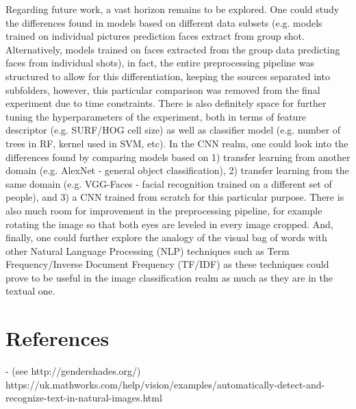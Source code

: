 \documentclass[11pt]{article}
\begin{document}
    Regarding future work, a vast horizon remains to be explored. One could study the differences found in models based on different data subsets (e.g. models trained on individual pictures prediction faces extract from group shot. Alternatively, models trained on faces extracted from the group data predicting faces from individual shots), in fact, the entire preprocessing pipeline was structured to allow for this differentiation, keeping the sources separated into subfolders, however, this particular comparison was removed from the final experiment due to time constraints. There is also definitely space for further tuning the hyperparameters of the experiment, both in terms of feature descriptor (e.g. SURF/HOG cell size) as well as classifier model (e.g. number of trees in RF, kernel used in SVM, etc). In the CNN realm, one could look into the differences found by comparing models based on 1) transfer learning from another domain (e.g. AlexNet - general object classification), 2) transfer learning from the same domain (e.g. VGG-Faces - facial recognition trained on a different set of people), and 3) a CNN trained from scratch for this particular purpose. There is also much room for improvement in the preprocessing pipeline, for example rotating the image so that both eyes are leveled in every image cropped. And, finally, one could further explore the analogy of the visual bag of words with other Natural Language Processing (NLP) techniques such as Term Frequency/Inverse Document Frequency (TF/IDF) as these techniques could prove to be useful in the image classification realm as much as they are in the textual one.

\section{References}
- (see http://gendershades.org/)
https://uk.mathworks.com/help/vision/examples/automatically-detect-and-recognize-text-in-natural-images.html
\end{document}
